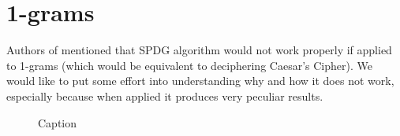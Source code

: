 \documentclass[shortabstract,lic,english]{iithesis}
\begin{document}
\section{1-grams}

Authors of \citep{liu2017unsupervised} mentioned that SPDG algorithm
would not work properly if applied to 1-grams (which would be equivalent to 
deciphering Caesar's Cipher). We would like to put some effort into 
understanding why and how it does not work, especially because when applied
it produces very peculiar results.

\begin{figure}
    \centering
    \def\svgwidth{\columnwidth}
    
    \caption{Caption}
    \label{fig:my_label}
\end{figure}





\end{document}
